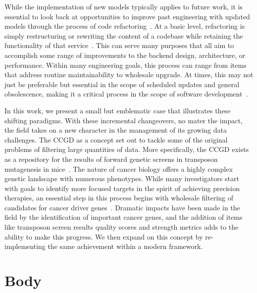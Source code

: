 \documentclass[10pt]{report}
\begin{document}
While the implementation of new models typically applies to future work, it is essential to look back at opportunities to improve past engineering with updated models through the process of code refactoring~\cite{fowlerRefactoringImprovingDesign1999}. At a basic level, refactoring is simply restructuring or rewriting the content of a codebase while retaining the functionality of that service~\cite{kerievskyRefactoringPatterns2004}. This can serve many purposes that all aim to accomplish some range of improvements to the backend design, architecture, or performance. Within many engineering goals, this process can range from items that address routine maintainability to wholesale upgrade. At times, this may not just be preferable but essential in the scope of scheduled updates and general obsolescence, making it a critical process in the scope of software development~\cite{kerievskyRefactoringPatterns2004}.

In this work, we present a small but emblematic case that illustrates these shifting paradigms. With these incremental changeovers, no mater the impact, the field takes on a new character in the management of its growing data challenges. The CCGD as a concept set out to tackle some of the original problems of filtering large quantities of data. More specifically, the CCGD exists as a repository for the results of forward genetic screens in transposon mutagenesis in mice~\cite{abbottCandidateCancerGene2015a}. The nature of cancer biology offers a highly complex genetic landscape with numerous phenotypes. While many investigators start with goals to identify more focused targets in the spirit of achieving precision therapies, an essential step in this process begins with wholesale filtering of candidates for cancer driver genes~\cite{clarkCancerGeneDiscovery2019}. Dramatic impacts have been made in the field by the identification of important cancer genes, and the addition of items like transposon screen results quality scores and strength metrics adds to the ability to make this progress. We then expand on this concept by re-implementing the same achievement within a modern framework.




\chapter{Body}
\end{document}
